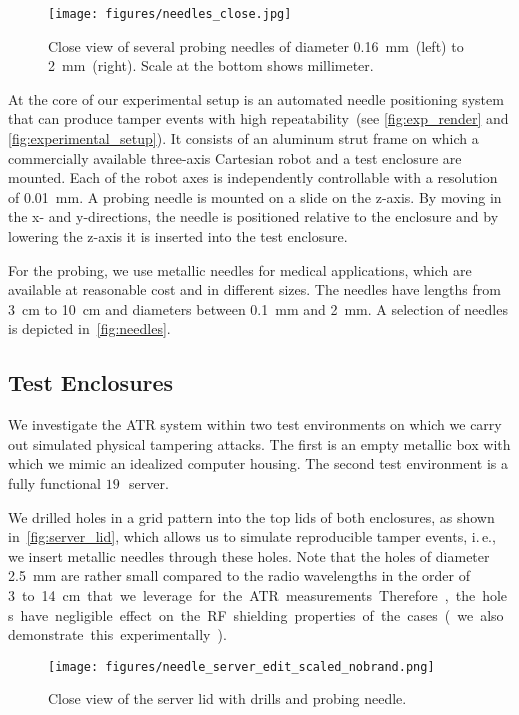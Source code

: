 \documentclass[conference]{IEEEtran}
\makeatletter
\newcommand{\ie}{i.\@\,e.\@\xspace}
\newcommand{\inch}{\,\textquotedbl}
\makeatother
\begin{document}
\begin{figure}
\centering
\texttt{[image: figures/needles\_close.jpg]}
\caption{Close view of several probing needles of diameter \SI{0.16}{\mm}~(left) to \SI{2}{\mm}~(right). Scale at the bottom shows millimeter.}
\label{fig:needles}
\end{figure}



At the core of our experimental setup is an automated needle positioning system that can produce tamper events with high repeatability~(see \autoref{fig:exp_render} and \autoref{fig:experimental_setup}). It consists of an aluminum strut frame on which a commercially available three-axis Cartesian robot and a test enclosure are mounted. Each of the robot axes is independently controllable with a resolution of \SI{0.01}{\mm}. A probing needle is mounted on a slide on the z-axis. By moving in the x- and y-directions, the needle is positioned relative to the enclosure and by lowering the z-axis it is inserted into the test enclosure. 

For the probing, we use metallic needles for medical applications, which are available at reasonable cost and in different sizes. The needles have lengths from \SI{3}{\cm} to \SI{10}{cm} and diameters between \SI{0.1}{\mm} and \SI{2}{\mm}. A selection of needles is depicted in~\autoref{fig:needles}. 



\subsection{Test Enclosures}
\label{sec:test_enclosures}
We investigate the ATR system within two test environments on which we carry out simulated physical tampering attacks. The first is an empty metallic box with which we mimic an idealized computer housing. The second test environment is a fully functional $19$\inch~server.

We drilled holes in a grid pattern into the top lids of both enclosures, as shown in~\autoref{fig:server_lid}, which allows us to simulate reproducible tamper events, \ie, we insert metallic needles through these holes. Note that the holes of diameter \SI{2.5}{\mm} are rather small compared to the radio wavelengths in the order of \SI{3}~to~\SI{14}{\cm} that we leverage for the ATR measurements. Therefore, the holes have negligible effect on the RF shielding properties of the cases (we also demonstrate this experimentally). 

\begin{figure}
\centering
\texttt{[image: figures/needle\_server\_edit\_scaled\_nobrand.png]}
\caption{Close view of the server lid with drills and probing needle.}
\label{fig:server_lid}
\end{figure}
\end{document}
